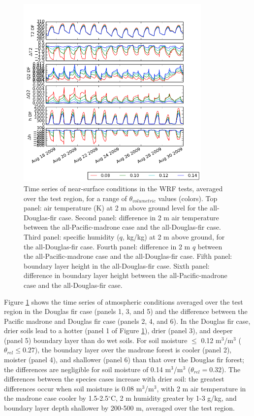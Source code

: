 \begin{figure}[here]
\includegraphics[width=0.85\textwidth]{ch2-BL/figures/T_Q_h_d02.png}
\caption{Time series of near-surface conditions in the WRF tests, averaged over the test region, for a range of $\theta_{volumetric}$ values (colors).  Top panel: air temperature (K) at 2 m above ground level for the all-Douglas-fir case.  Second panel: difference in 2 m air temperature between the all-Pacific-madrone case and the all-Douglas-fir case.  Third panel: specific humidity ($q$, kg/kg) at 2 m above ground, for the all-Douglas-fir case.  Fourth panel: difference in 2 m $q$ between the all-Pacific-madrone case and the all-Douglas-fir case.  Fifth panel: boundary layer height in the all-Douglas-fir case.  Sixth panel: difference in boundary layer height between the all-Pacific-madrone case and the all-Douglas-fir case.}
\label{fig:BL_WRFtseries}
\end{figure}

Figure \ref{fig:BL_WRFtseries} shows the time series of atmospheric conditions averaged over the test region in the Douglas fir case (panels 1, 3, and 5) and the difference between the Pacific madrone and Douglas fir case (panels 2, 4, and 6).  In the Douglas fir case, drier soils lead to a hotter (panel 1 of Figure \ref{fig:BL_WRFtseries}), drier (panel 3), and deeper (panel 5) boundary layer than do wet soils.  For soil moisture $\le$ 0.12 m$^3$/m$^3$ ($\theta_{rel} \le 0.27$), the boundary layer over the madrone forest is cooler (panel 2), moister (panel 4), and shallower (panel 6) than that over the Douglas fir forest; the differences are negligible for soil moisture of 0.14 m$^3$/m$^3$ ($\theta_{rel} = 0.32$).  The differences between the species cases increase with drier soil: the greatest differences occur when soil moisture is 0.08 m$^3$/m$^3$, with 2 m air temperature in the madrone case cooler by 1.5-2.5$^\circ$C, 2 m humidity greater by 1-3 g/kg, and boundary layer depth shallower by 200-500 m, averaged over the test region.

